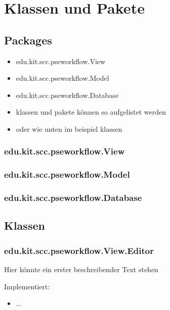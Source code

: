 \chapter{Klassen und Pakete}

    \section{Packages}
        \begin{itemize}
            \item edu.kit.scc.pseworkflow.View
            \item edu.kit.scc.pseworkflow.Model
            \item edu.kit.scc.pseworkflow.Database
            \item klassen und pakete können so aufgelistet werden
            \item oder wie unten im beispiel klassen
        \end{itemize}
        
        \subsection{edu.kit.scc.pseworkflow.View}
        \subsection{edu.kit.scc.pseworkflow.Model}
        \subsection{edu.kit.scc.pseworkflow.Database}
        
    \section{Klassen}
    
        \subsection{edu.kit.scc.pseworkflow.View.Editor}
        
            Hier könnte ein erster beschreibender Text stehen
            
            Implementiert:
            \begin{itemize}
                \item ...
            \end{itemize}
            
